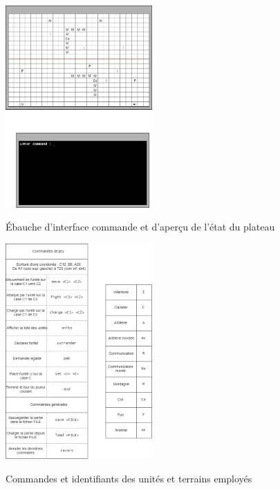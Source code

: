\documentclass[a4paper]{report}
\begin{document}

\begin{figure}[h]
\caption{\'Ebauche d'interface commande et d'aperçu de l'état du plateau}
\centering
\includegraphics[width=0.5\textwidth]{interface_pdp2}
\label{fig:prerelease}
\end{figure}

\begin{figure}[h]
\caption{Commandes et identifiants des unités et terrains employés}
\centering
\includegraphics[width=0.5\textwidth]{interface_pdp}
\label{fig:commands}
\end{figure}
\end{document}
